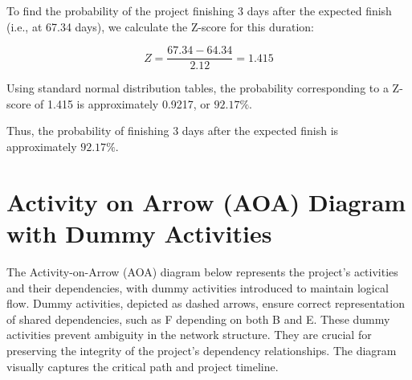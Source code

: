 \documentclass{article}
\begin{document}
To find the probability of the project finishing 3 days after the expected finish (i.e., at 67.34 days), we calculate the Z-score for this duration:

\[
Z = \frac{67.34 - 64.34}{2.12} = 1.415
\]

Using standard normal distribution tables, the probability corresponding to a Z-score of 1.415 is approximately 0.9217, or \(92.17\%\).

Thus, the probability of finishing 3 days after the expected finish is approximately \( \boxed{92.17\%} \).




\vspace{1em}

\pagebreak
\section*{Activity on Arrow (AOA) Diagram with Dummy Activities}

The Activity-on-Arrow (AOA) diagram below represents the project’s activities and their dependencies, with dummy activities introduced to maintain logical flow. Dummy activities, depicted as dashed arrows, ensure correct representation of shared dependencies, such as F depending on both B and E. These dummy activities prevent ambiguity in the network structure. They are crucial for preserving the integrity of the project’s dependency relationships. The diagram visually captures the critical path and project timeline.
\end{document}
